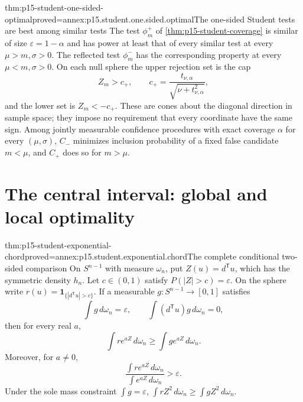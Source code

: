 \begin{hbtheorem}{thm:p15-student-one-sided-optimal}{proved=annex:p15.student.one.sided.optimal}{The one-sided Student tests are best among similar tests}
The test \(\phi_m^+\) of
\cref{thm:p15-student-coverage} is similar of size
\(\varepsilon=1-\alpha\) and has power at least that of every
similar test at every \(\mu>m,\sigma>0\).
The reflected test \(\phi_m^-\) has the corresponding property
at every \(\mu<m,\sigma>0\).
On each null sphere the upper rejection set is the cap
\[
 Z_m>c_+,\qquad
 c_+=\frac{t_{\nu,\alpha}}
                {\sqrt{\nu+t_{\nu,\alpha}^2}},
\]
and the lower set is \(Z_m<-c_+\).
These are cones about the diagonal direction in sample space;
they impose no requirement that every coordinate have the
same sign. Among jointly measurable confidence procedures
with exact coverage \(\alpha\) for every \((\mu,\sigma)\),
\(C_-\) minimizes inclusion probability of a fixed false
candidate \(m<\mu\), and \(C_+\) does so for \(m>\mu\).
\end{hbtheorem}

\section{The central interval: global and local optimality}

\begin{hblemma}{thm:p15-student-exponential-chord}{proved=annex:p15.student.exponential.chord}{The complete conditional two-sided comparison}
On \(S^{n-1}\) with measure \(\omega_n\), put
\(Z(u)=d^{\mathsf T}u\), which has the symmetric density \(h_n\).
Let
\(c\in(0,1)\) satisfy \(P(|Z|>c)=\varepsilon\).
On the sphere write \(r(u)=\mathbf1_{\{|d^{\mathsf T}u|>c\}}\).
If a measurable \(g:S^{n-1}\to[0,1]\) satisfies
\[
                  \int g\,d\omega_n=\varepsilon,\qquad
                  \int (d^{\mathsf T}u)g\,d\omega_n=0,
\]
then for every real \(a\),
\[
                  \int r e^{aZ}\,d\omega_n
                         \geq\int g e^{aZ}\,d\omega_n.
\]
Moreover, for \(a\ne0\),
\[
                  \frac{\int r e^{aZ}\,d\omega_n}
                       {\int e^{aZ}\,d\omega_n}>\varepsilon.
\]
Under the sole mass constraint \(\int g=\varepsilon\),
\(\int rZ^2\,d\omega_n\geq\int gZ^2\,d\omega_n\).
\end{hblemma}

